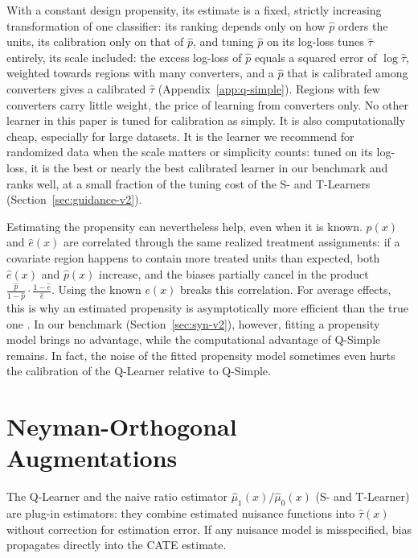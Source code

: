 \documentclass{article}
\begin{document}
With a constant design propensity, its
estimate is a fixed, strictly increasing transformation of one
classifier: its
ranking depends only on how $\hat{p}$ orders the units, its
calibration only on that of $\hat{p}$, and tuning $\hat{p}$ on its
log-loss tunes $\hat{\tau}$ entirely, its scale included: the excess log-loss of
$\hat{p}$ equals a squared error of $\log\hat{\tau}$, weighted towards
regions with many converters, and a $\hat{p}$ that is calibrated among
converters gives a calibrated $\hat{\tau}$ (Appendix~\ref{app:q-simple}).
Regions with few converters carry little weight, the price of learning
from converters only. No other learner in this paper is tuned for
calibration as simply. It is also computationally cheap,
especially for large datasets. It is the learner we recommend for
randomized data when the scale matters or simplicity counts: tuned on its
log-loss, it is the best or nearly the best calibrated learner in our
benchmark and ranks well, at a small fraction of the tuning cost of the S-
and T-Learners (Section~\ref{sec:guidance-v2}).

Estimating the propensity can nevertheless help, even when it is known.
$\hat{p}(x)$ and $\hat{e}(x)$ are correlated through the same realized treatment
assignments: if a covariate region happens to contain more treated
units than expected, both $\hat{e}(x)$ and $\hat{p}(x)$ increase, and
the biases partially cancel in the product
$\frac{\hat{p}}{1-\hat{p}} \cdot \frac{1-\hat{e}}{\hat{e}}$. Using the
known $e(x)$ breaks this correlation. For average effects, this is why
an estimated propensity is asymptotically more efficient than the true
one \citep{hirano2003efficient}. In our benchmark
(Section~\ref{sec:syn-v2}), however, fitting a propensity model brings no
advantage, while the computational advantage of Q-Simple remains. In
fact, the noise of the fitted propensity model sometimes even hurts the
calibration of the Q-Learner relative to Q-Simple.

\section{Neyman-Orthogonal Augmentations}
\label{sec:dr}
The Q-Learner and the naive ratio estimator $\hat{\mu}_1(x)/\hat{\mu}_0(x)$
(S- and T-Learner) are plug-in estimators: they combine estimated nuisance
functions into $\hat{\tau}(x)$ without correction for estimation error. If any nuisance model is misspecified,
bias propagates directly into the CATE estimate.
\end{document}
